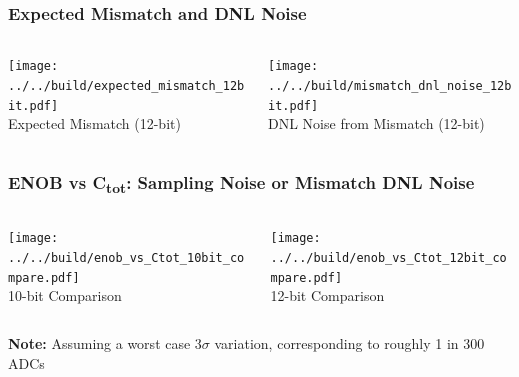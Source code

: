 \documentclass[aspectratio=169]{beamer}
\begin{document}
\begin{frame}
  \frametitle{Expected Mismatch and DNL Noise}
  \begin{columns}
    \begin{column}{0.5\textwidth}
      \begin{center}
        \texttt{[image: ../../build/expected\_mismatch\_12bit.pdf]}
        \\
        \small Expected Mismatch (12-bit)
      \end{center}
    \end{column}
    \begin{column}{0.5\textwidth}
      \begin{center}
        \texttt{[image: ../../build/mismatch\_dnl\_noise\_12bit.pdf]}
        \\
        \small DNL Noise from Mismatch (12-bit)
      \end{center}
    \end{column}
  \end{columns}
\end{frame}


\begin{frame}
  \frametitle{ENOB vs C\textsubscript{tot}: Sampling Noise or Mismatch DNL Noise}

  \begin{columns}
    \begin{column}{0.5\textwidth}
      \begin{center}
        \texttt{[image: ../../build/enob\_vs\_Ctot\_10bit\_compare.pdf]}
        \\
        \small 10-bit Comparison
      \end{center}
    \end{column}
    \begin{column}{0.5\textwidth}
      \begin{center}
        \texttt{[image: ../../build/enob\_vs\_Ctot\_12bit\_compare.pdf]}
        \\
        \small 12-bit Comparison
      \end{center}
    \end{column}
  \end{columns}
  \begin{center}
    \small
    \textbf{Note:} Assuming a worst case $3\sigma$ variation, corresponding to roughly 1 in 300 ADCs
  \end{center}
\end{frame}
\end{document}
